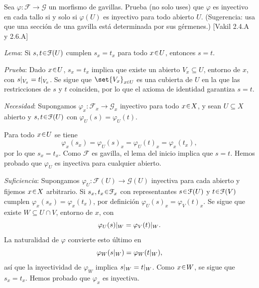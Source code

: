 \begin{ejer}\label{ejer:t3-inyectividad-tallos}
Sea $\varphi\colon\mathcal F\to\mathcal G$ un morfismo de gavillas. Prueba (no solo uses) que $\varphi$ es inyectivo en cada tallo si y solo si $\varphi(U)$ es inyectivo para todo abierto $U$. (Sugerencia: usa que una sección de una gavilla está determinada por sus gérmenes.) \hfill [Vakil 2.4.A y 2.6.A]
\end{ejer}
\begin{sol}
\noindent\emph{Lema}: Si $s,t\en\mathcal F(U)$ cumplen $s_x=t_x$ para todo $x\en U$, entonces $s=t$.

\noindent\emph{Prueba}: Dado $x\en U$, $s_x=t_x$ implica que existe un abierto $V_x\subseteq U$, entorno de $x$, con $\restr{s}{V_x}=\restr{t}{V_x}$. Se sigue que $\set{V_x}_{x\en U}$ es una cubierta de $U$ en la que las restricciones de $s$ y $t$ coinciden, por lo que el axioma de identidad garantiza $s=t$.

\medskip
\noindent\emph{Necesidad}: Supongamos $\varphi_x\colon\mathcal F_x\to\mathcal G_x$ inyectivo para todo $x\en X$, y sean $U\subseteq X$ abierto y $s,t\en\mathcal F(U)$ con $\varphi_U(s)=\varphi_U(t)$.

Para todo $x\en U$ se tiene
\[
\varphi_x(s_x)=\varphi_U(s)_x=\varphi_U(t)_x=\varphi_x(t_x),
\]
por lo que $s_x=t_x$. Como $\mathcal F$ es gavilla, el lema del inicio implica que $s=t$. Hemos probado que $\varphi_U$ es inyectiva para cualquier abierto.

\medskip
\noindent\emph{Suficiencia}: Supongamos $\varphi_U\colon\mathcal F(U)\to\mathcal G(U)$ inyectiva para cada abierto y fijemos $x\en X$ arbitrario. Si $s_x,t_x\en\mathcal F_x$ con representantes $s\en\mathcal F(U)$ y $t\en\mathcal F(V)$ cumplen $\varphi_x(s_x)=\varphi_x(t_x)$, por definición $\varphi_U(s)_x=\varphi_V(t)_x$. Se sigue que existe $W\subseteq U\cap V$, entorno de $x$, con
\[
\restr{\varphi_U(s)}{W}=\restr{\varphi_V(t)}{W}.
\]
La naturalidad de $\varphi$ convierte esto último en
\[
\varphi_W(\restr{s}{W})=\varphi_W(\restr{t}{W}),
\]
así que la inyectividad de $\varphi_W$ implica $\restr{s}{W}=\restr{t}{W}$. Como $x\en W$, se sigue que $s_x=t_x$. Hemos probado que $\varphi_x$ es inyectiva.
\end{sol}
